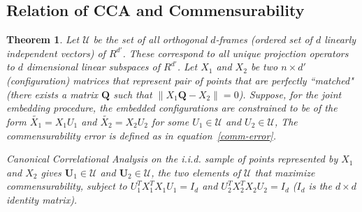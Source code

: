 \documentclass[12pt,oneside,final]{thesis}\usepackage[]{graphicx}\usepackage[]{color}
\newtheorem{thm}{Theorem}
\begin{document}
\subsection{Relation of CCA and Commensurability} 

\begin{thm}
Let $ \mathcal{U}$ be the set of all orthogonal $d$-frames 
(ordered set of $d$ linearly independent vectors) of $R^{d'}$. These correspond to all unique projection operators to $d$ dimensional linear subspaces of  $R^{d'}$.
Let $X_1$ and $X_2$ be two $n\times d'$ (configuration) matrices that represent pair of points that are perfectly ``matched"
 (there exists a  matrix $\mathbf{Q}$ such that $\|   X_1\mathbf{Q}  -X_2 \|=0$).
 Suppose, for the joint embedding procedure, the embedded configurations are constrained to be of the form $\tilde{X_1}=X_1U_1$ and $\tilde{X_2}=X_2U_2$ for some  $U_1\in \mathcal{U}$ and $U_2\in  \mathcal{U}$,
The commensurability error is  defined as
in equation~\eqref{comm-error}.
 
 Canonical Correlational Analysis on the  \emph{i.i.d.} sample of points represented by  $X_1$ and $X_2$ gives $\mathbf{U}_1\in\mathcal{U}$ and  $\mathbf{U}_2\in\mathcal{U}$, 
 the two elements of $\mathcal{U}$ that maximize commensurability, subject to $U_1^{T}X_1^{T}X_1U_1=I_d$ and $U_2^{T}X_2^{T}X_2U_2=I_d$ ($I_d$ is the $d \times d$ identity matrix).
\end{thm}
\end{document}
